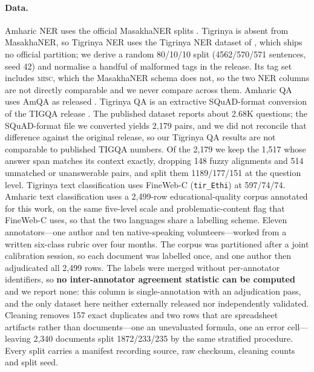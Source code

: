 \documentclass[11pt]{article}
\begin{document}
\paragraph{Data.} Amharic NER uses the official MasakhaNER splits
\citep{adelani-etal-2021-masakhaner}. Tigrinya is absent from MasakhaNER, so
Tigrinya NER uses the Tigrinya NER dataset of
\citet{yohannes-amagasa-2022-ner}, which ships no official partition; we
derive a random 80/10/10 split (4562/570/571 sentences, seed 42) and
normalise a handful of malformed tags in the release. Its tag set includes
\textsc{misc}, which the MasakhaNER schema does not, so the two NER columns
are not directly comparable and we never compare across them. Amharic QA uses
AmQA
as released \citep{taffa-etal-2024-amqa}. Tigrinya QA is an extractive SQuAD-format conversion of the TIGQA release
\citep{teklehaymanot-etal-2024-tigqa}. The published dataset reports about
2.68K questions; the SQuAD-format file we converted yields 2{,}179 pairs, and
we did not reconcile that difference against the original release, so our
Tigrinya QA results are not comparable to published TIGQA numbers. Of the
2{,}179 we keep the 1{,}517 whose answer span matches its context exactly,
dropping 148 fuzzy alignments and 514 unmatched or unanswerable pairs, and
split them 1189/177/151 at the question level. Tigrinya text classification uses FineWeb-C
\citep{kydlicek-etal-2025-fineweb2} (\texttt{tir\_Ethi}) at 597/74/74.
Amharic text classification uses a 2{,}499-row educational-quality corpus
annotated for this work, on the same five-level scale and
problematic-content flag that FineWeb-C uses, so that the two languages share
a labelling scheme. Eleven annotators---one author and ten native-speaking
volunteers---worked from a written six-class rubric over four months. The
corpus was partitioned after a joint calibration session, so each document was
labelled once, and one author then adjudicated all 2{,}499 rows. The labels
were merged without per-annotator identifiers, so \textbf{no inter-annotator
agreement statistic can be computed} and we report none: this column is
single-annotation with an adjudication pass, and the only dataset here neither
externally released nor independently validated.
Cleaning removes 157 exact duplicates and two
rows that are spreadsheet artifacts rather than documents---one an unevaluated
formula, one an error cell---leaving 2{,}340 documents split 1872/233/235 by
the same stratified procedure. Every split carries a manifest recording
source, raw checksum, cleaning counts and split seed.
\end{document}
